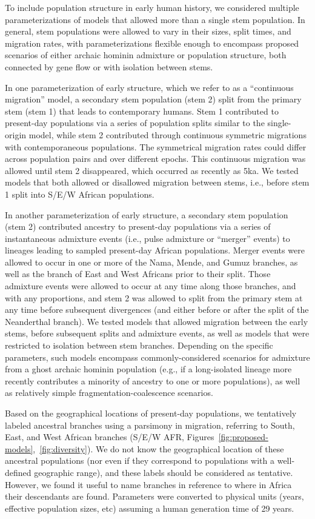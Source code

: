 \documentclass[]{article}
\begin{document}
To include population structure in early human history, we considered multiple
parameterizations of models that allowed more than a single stem population. In
general, stem populations were allowed to vary in their sizes, split times, and
migration rates, with parameterizations flexible enough to encompass proposed
scenarios of either archaic hominin admixture or population structure, both connected
by gene flow or with isolation between stems.

In one parameterization of early structure, which we refer to as a “continuous
migration” model, a secondary stem population (stem 2) split from the primary
stem (stem 1) that leads to contemporary humans. Stem 1 contributed to present-day
populations via a series of population splits similar to the single-origin
model, while stem 2 contributed through continuous symmetric migrations with
contemporaneous populations. The symmetrical migration rates could differ
across population pairs and over different epochs. This continuous migration
was allowed until stem 2 disappeared, which occurred as recently as 5ka. We
tested models that both allowed or disallowed migration between stems, i.e.,
before stem 1 split into S/E/W African populations.

In another parameterization of early structure, a secondary stem population
(stem 2) contributed ancestry to present-day populations via a series of
instantaneous admixture events (i.e., pulse admixture or “merger” events) to
lineages leading to sampled present-day African populations. Merger events were
allowed to occur in one or more of the Nama, Mende, and Gumuz branches, as well
as the branch of East and West Africans prior to their split. Those admixture
events were allowed to occur at any time along those branches, and with any
proportions, and stem 2 was allowed to split from the primary stem at any time
before subsequent divergences (and either before or after the split of the
Neanderthal branch). We tested models that allowed migration between the early
stems, before subsequent splits and admixture events, as well as models that
were restricted to isolation between stem branches. Depending on the specific
parameters, such models encompass commonly-considered scenarios for admixture
from a ghost archaic hominin population (e.g., if a long-isolated lineage more
recently contributes a minority of ancestry to one or more populations), as
well as relatively simple fragmentation-coalescence scenarios.

Based on the geographical locations of present-day populations, we tentatively
labeled ancestral branches using a parsimony in migration, referring to South,
East, and West African branches
(S/E/W AFR, Figures~\ref{fig:proposed-models},~\ref{fig:diversity}). We do not know the
geographical location of these ancestral populations (nor even if they
correspond to populations with a well-defined geographic range), and these
labels should be considered as tentative. However, we found it useful to name
branches in reference to where in Africa their descendants are found.
Parameters were converted to physical units
(years, effective population sizes, etc)
assuming a human generation time of 29 years.
\end{document}
